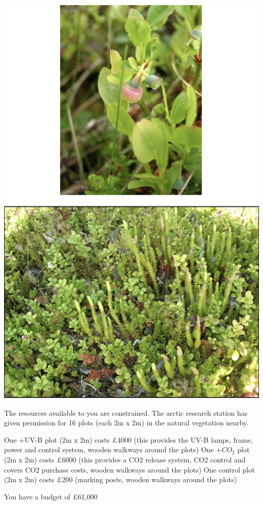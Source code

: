 \documentclass[
]{book}
\begin{document}
\includegraphics[width=6.69in]{images/ArcticPlants}

The resources available to you are constrained. The arctic research station has given permission for 16 plots (each 2m x 2m) in the natural vegetation nearby.

One +UV-B plot (2m x 2m) costs £4000 (this provides the UV-B lamps, frame, power and control system, wooden walkways around the plots)
One \(+CO_{2}\) plot (2m x 2m) costs £6000 (this provides a CO2 release system, CO2 control and covers CO2 purchase costs, wooden walkways around the plots)
One control plot (2m x 2m) costs £200 (marking posts, wooden walkways around the plots)

You have a budget of £61,000
\end{document}
